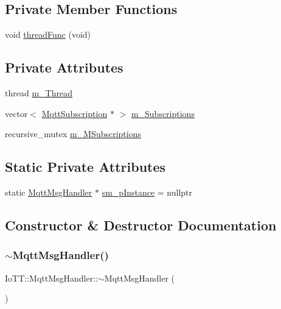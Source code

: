 \subsection*{Private Member Functions}
\begin{DoxyCompactItemize}
\item 
void \hyperlink{classIoTT_1_1MqttMsgHandler_a600695bb4d3736efd739ed4a35c3c7d3}{thread\+Func} (void)
\end{DoxyCompactItemize}
\subsection*{Private Attributes}
\begin{DoxyCompactItemize}
\item 
thread \hyperlink{classIoTT_1_1MqttMsgHandler_a35d336e903050e3b2cdd61f5043c403a}{m\+\_\+\+Thread}
\item 
vector$<$ \hyperlink{classIoTT_1_1MqttSubscription}{Mqtt\+Subscription} $\ast$ $>$ \hyperlink{classIoTT_1_1MqttMsgHandler_adf7d1fafda4cee41a9e00a9481157fc0}{m\+\_\+\+Subscriptions}
\item 
recursive\+\_\+mutex \hyperlink{classIoTT_1_1MqttMsgHandler_a82e4c0dc5fd6025a7ce96dbf3e5edbf3}{m\+\_\+\+M\+Subscriptions}
\end{DoxyCompactItemize}
\subsection*{Static Private Attributes}
\begin{DoxyCompactItemize}
\item 
static \hyperlink{classIoTT_1_1MqttMsgHandler}{Mqtt\+Msg\+Handler} $\ast$ \hyperlink{classIoTT_1_1MqttMsgHandler_a16f295286a833a7c905a126db6a60118}{sm\+\_\+p\+Instance} = nullptr
\end{DoxyCompactItemize}


\subsection{Constructor \& Destructor Documentation}
\mbox{\label{classIoTT_1_1MqttMsgHandler_ae5c149f6342c56965941bb18239e8057}} 
\subsubsection{\texorpdfstring{$\sim$\+Mqtt\+Msg\+Handler()}{~MqttMsgHandler()}}
{\footnotesize\ttfamily Io\+T\+T\+::\+Mqtt\+Msg\+Handler\+::$\sim$\+Mqtt\+Msg\+Handler (\begin{DoxyParamCaption}{ }\end{DoxyParamCaption})\hspace{0.3cm}{\ttfamily [virtual]}}

